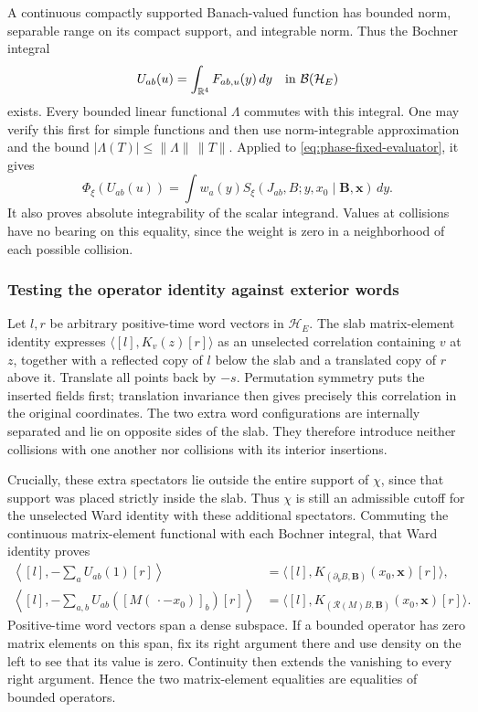 A continuous compactly supported Banach-valued function has bounded
norm, separable range on its compact support, and integrable norm.
Thus the Bochner integral
\[
                   U_{ab}(u)=\int_{\mathbb R^4}F_{ab,u}(y)\,dy
                \quad\hbox{in }\mathcal B(\mathcal H_E)
\]
exists. Every bounded linear functional $\Lambda$ commutes with this
integral. One may verify this first for simple functions and then use
norm-integrable approximation and the bound
$|\Lambda(T)|\le\|\Lambda\|\,\|T\|$. Applied to
\eqref{eq:phase-fixed-evaluator}, it gives
\begin{equation}\label{eq:phase-shell-evaluation}
 \Phi_\xi(U_{ab}(u))=
 \int w_a(y)S_\xi(J_{ab},B;y,x_0\mid\boldsymbol B,\boldsymbol x)\,dy.
\end{equation}
It also proves absolute integrability of the scalar integrand. Values
at collisions have no bearing on this equality, since the weight is
zero in a neighborhood of each possible collision.

\subsubsection{Testing the operator identity against exterior words}

Let $l,r$ be arbitrary positive-time word vectors in $\mathcal H_E$.
The slab matrix-element identity expresses
$\langle[l],K_v(z)[r]\rangle$ as an unselected correlation containing
$v$ at $z$, together with a reflected copy of $l$ below the slab and
a translated copy of $r$ above it. Translate all points back by $-s$.
Permutation symmetry puts the inserted fields first; translation
invariance then gives precisely this correlation in the original
coordinates. The two extra word configurations are internally
separated and lie on opposite sides of the slab. They therefore
introduce neither collisions with one another nor collisions with
its interior insertions.

Crucially, these extra spectators lie outside the entire support of
$\chi$, since that support was placed strictly inside the slab.
Thus $\chi$ is still an admissible cutoff for the unselected Ward
identity with these additional spectators. Commuting the continuous
matrix-element functional with each Bochner integral, that Ward
identity proves
\begin{align*}
 \left\langle[l],-\sum_aU_{ab}(1)[r]\right\rangle
 &=\langle[l],K_{(\partial_bB,\boldsymbol B)}
                       (x_0,\boldsymbol x)[r]\rangle,\\
 \left\langle[l],-\sum_{a,b}U_{ab}([M(\,\cdot-x_0)]_b)[r]\right\rangle
 &=\langle[l],K_{(\mathcal R(M)B,\boldsymbol B)}
                       (x_0,\boldsymbol x)[r]\rangle.
\end{align*}
Positive-time word vectors span a dense subspace. If a bounded operator
has zero matrix elements on this span, fix its right argument there
and use density on the left to see that its value is zero. Continuity
then extends the vanishing to every right argument. Hence the two
matrix-element equalities are equalities of bounded operators.

